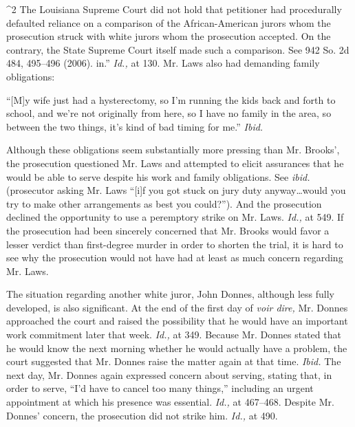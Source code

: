 {{^2 The Louisiana Supreme Court did not hold that petitioner had
procedurally defaulted reliance on a comparison of the African-American
jurors whom the prosecution struck with white jurors whom the
prosecution accepted. On the contrary, the State Supreme Court itself
made such a comparison. See 942 So. 2d 484, 495--496 (2006).
\newpage  in.'' \emph{Id.,} at 130. Mr. Laws also had demanding family
obligations:

    ``[M]y wife just had a hysterectomy, so I'm running the kids back
    and forth to school, and we're not originally from here, so I have
    no family in the area, so between the two things, it's kind of bad
    timing for me.'' \emph{Ibid.}

\noindent Although these obligations seem substantially more pressing than Mr.
Brooks', the prosecution questioned Mr. Laws and attempted to elicit
assurances that he would be able to serve despite his work and family
obligations. See \emph{ibid.} (prosecutor asking Mr. Laws ``[i]f you
got stuck on jury duty anyway\dots would you try to make other
arrangements as best you could?''). And the prosecution declined the
opportunity to use a peremptory strike on Mr. Laws. \emph{Id.,} at 549.
If the prosecution had been sincerely concerned that Mr. Brooks would
favor a lesser verdict than first-degree murder in order to shorten the
trial, it is hard to see why the prosecution would not have had at least
as much concern regarding Mr. Laws.

  The situation regarding another white juror, John Donnes, although
less fully developed, is also significant. At the end of the first
day of \emph{voir dire,} Mr. Donnes approached the court and raised the
possibility that he would have an important work commitment later that
week. \emph{Id.,} at 349. Because Mr. Donnes stated that he would
know the next morning whether he would actually have a problem, the
court suggested that Mr. Donnes raise the matter again at that time.
\emph{Ibid.} The next day, Mr. Donnes again expressed concern about
serving, stating that, in order to serve, ``I'd have to cancel too
many things,'' including an urgent appointment at which his presence
was essential. \emph{Id.,} at 467--468. Despite Mr. Donnes' concern,
the prosecution did not strike him. \emph{Id.,} at 490.

}}
